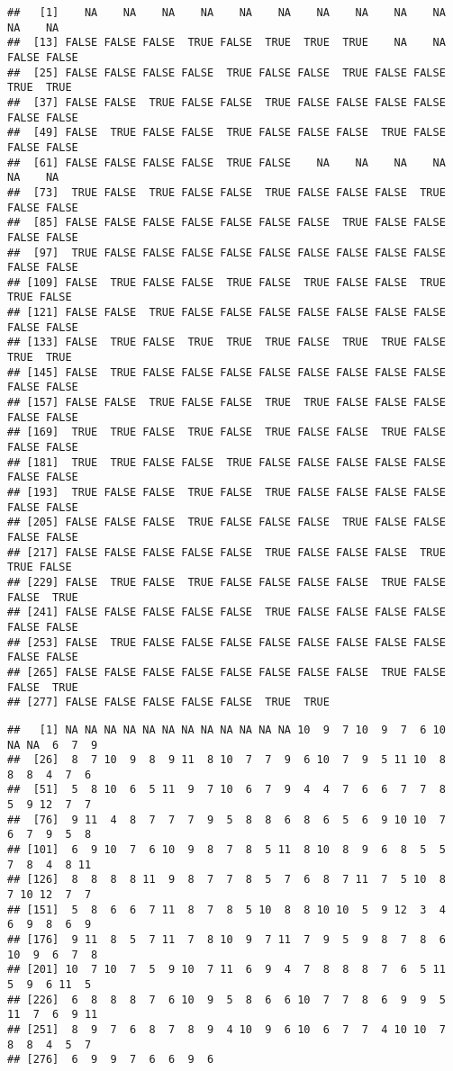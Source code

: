 \documentclass[
  xelatex,ja=standard]{bxjsarticle}
\begin{document}
\begin{verbatim}
##   [1]    NA    NA    NA    NA    NA    NA    NA    NA    NA    NA    NA    NA
##  [13] FALSE FALSE FALSE  TRUE FALSE  TRUE  TRUE  TRUE    NA    NA FALSE FALSE
##  [25] FALSE FALSE FALSE FALSE  TRUE FALSE FALSE  TRUE FALSE FALSE  TRUE  TRUE
##  [37] FALSE FALSE  TRUE FALSE FALSE  TRUE FALSE FALSE FALSE FALSE FALSE FALSE
##  [49] FALSE  TRUE FALSE FALSE  TRUE FALSE FALSE FALSE  TRUE FALSE FALSE FALSE
##  [61] FALSE FALSE FALSE FALSE  TRUE FALSE    NA    NA    NA    NA    NA    NA
##  [73]  TRUE FALSE  TRUE FALSE FALSE  TRUE FALSE FALSE FALSE  TRUE FALSE FALSE
##  [85] FALSE FALSE FALSE FALSE FALSE FALSE FALSE  TRUE FALSE FALSE FALSE FALSE
##  [97]  TRUE FALSE FALSE FALSE FALSE FALSE FALSE FALSE FALSE FALSE FALSE FALSE
## [109] FALSE  TRUE FALSE FALSE  TRUE FALSE  TRUE FALSE FALSE  TRUE  TRUE FALSE
## [121] FALSE FALSE  TRUE FALSE FALSE FALSE FALSE FALSE FALSE FALSE FALSE FALSE
## [133] FALSE  TRUE FALSE  TRUE  TRUE  TRUE FALSE  TRUE  TRUE FALSE  TRUE  TRUE
## [145] FALSE  TRUE FALSE FALSE FALSE FALSE FALSE FALSE FALSE FALSE FALSE FALSE
## [157] FALSE FALSE  TRUE FALSE FALSE  TRUE  TRUE FALSE FALSE FALSE FALSE FALSE
## [169]  TRUE  TRUE FALSE  TRUE FALSE  TRUE FALSE FALSE  TRUE FALSE FALSE FALSE
## [181]  TRUE  TRUE FALSE FALSE  TRUE FALSE FALSE FALSE FALSE FALSE FALSE FALSE
## [193]  TRUE FALSE FALSE  TRUE FALSE  TRUE FALSE FALSE FALSE FALSE FALSE FALSE
## [205] FALSE FALSE FALSE  TRUE FALSE FALSE FALSE  TRUE FALSE FALSE FALSE FALSE
## [217] FALSE FALSE FALSE FALSE FALSE  TRUE FALSE FALSE FALSE  TRUE  TRUE FALSE
## [229] FALSE  TRUE FALSE  TRUE FALSE FALSE FALSE FALSE  TRUE FALSE FALSE  TRUE
## [241] FALSE FALSE FALSE FALSE FALSE  TRUE FALSE FALSE FALSE FALSE FALSE FALSE
## [253] FALSE  TRUE FALSE FALSE FALSE FALSE FALSE FALSE FALSE FALSE FALSE FALSE
## [265] FALSE FALSE FALSE FALSE FALSE FALSE FALSE FALSE  TRUE FALSE FALSE  TRUE
## [277] FALSE FALSE FALSE FALSE FALSE  TRUE  TRUE
\end{verbatim}

\begin{verbatim}
##   [1] NA NA NA NA NA NA NA NA NA NA NA NA 10  9  7 10  9  7  6 10 NA NA  6  7  9
##  [26]  8  7 10  9  8  9 11  8 10  7  7  9  6 10  7  9  5 11 10  8  8  8  4  7  6
##  [51]  5  8 10  6  5 11  9  7 10  6  7  9  4  4  7  6  6  7  7  8  5  9 12  7  7
##  [76]  9 11  4  8  7  7  7  9  5  8  8  6  8  6  5  6  9 10 10  7  6  7  9  5  8
## [101]  6  9 10  7  6 10  9  8  7  8  5 11  8 10  8  9  6  8  5  5  7  8  4  8 11
## [126]  8  8  8  8 11  9  8  7  7  8  5  7  6  8  7 11  7  5 10  8  7 10 12  7  7
## [151]  5  8  6  6  7 11  8  7  8  5 10  8  8 10 10  5  9 12  3  4  6  9  8  6  9
## [176]  9 11  8  5  7 11  7  8 10  9  7 11  7  9  5  9  8  7  8  6 10  9  6  7  8
## [201] 10  7 10  7  5  9 10  7 11  6  9  4  7  8  8  8  7  6  5 11  5  9  6 11  5
## [226]  6  8  8  8  7  6 10  9  5  8  6  6 10  7  7  8  6  9  9  5 11  7  6  9 11
## [251]  8  9  7  6  8  7  8  9  4 10  9  6 10  6  7  7  4 10 10  7  8  8  4  5  7
## [276]  6  9  9  7  6  6  9  6
\end{verbatim}
\end{document}
